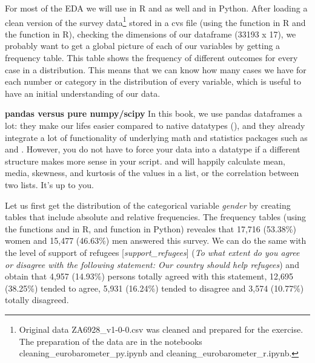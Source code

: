 For most of the EDA we will use  in R and  as well  and  in Python. After loading a clean version of the survey data\footnote{Original data ZA6928\_v1-0-0.csv was cleaned and prepared for the exercise. The preparation of the data are in the notebooks cleaning\_eurobarometer\_py.ipynb and cleaning\_eurobarometer\_r.ipynb.}  stored in a cvs file (using the  function  in R and the  function  in R), checking the dimensions of our dataframe (33193 x 17), we probably want to get a global picture of each of our variables by getting a frequency table. This table shows the frequency of different outcomes for every case in a distribution. This means that we can know how many cases we have for each number or category in the distribution of every variable, which is useful to have an initial understanding of our data.

\begin{feature}
  \textbf{pandas versus pure numpy/scipy} In this book, we use pandas
  dataframes a lot: they make our lifes easier compared to native
  datatypes (), and they already integrate a lot of
  functionality of underlying math and statistics packages such as
   and . However, you do not have to force your
  data into a datatype if a different structure makes more sense in
  your script.  and  will happily calculate
  mean, media, skewness, and kurtosis of the values in a list, or the
  correlation between two lists. It's up to you.
\end{feature}


		
Let us first get the distribution of the categorical variable \textit{gender} by creating tables that include absolute and relative frequencies. The frequency tables (using the  functions  and  in R, and  function  in Python) reveales that 17,716 (53.38\%) women and 15,477 (46.63\%) men answered this survey. We can do the same with the level of support of refugees [\textit{support\_refugees}] (\textit{To what extent do you agree or disagree with the following statement: Our country should help refugees}) and obtain that 4,957 (14.93\%) persons totally agreed with this statement, 12,695 (38.25\%) tended to agree, 5,931 (16.24\%) tended to disagree and 3,574 (10.77\%) totally disagreed. 

